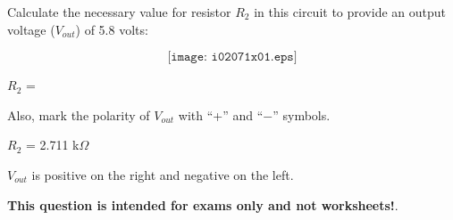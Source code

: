 

Calculate the necessary value for resistor $R_2$ in this circuit to provide an output voltage ($V_{out}$) of 5.8 volts:

$$\texttt{[image: i02071x01.eps]}$$

$R_2$ = 

\vskip 10pt

Also, mark the polarity of $V_{out}$ with ``+'' and ``$-$'' symbols.

\vskip 10pt







$R_2$ = 2.711 k$\Omega$

\vskip 10pt

$V_{out}$ is positive on the right and negative on the left.







{\bf This question is intended for exams only and not worksheets!}.


